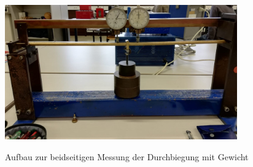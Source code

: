 \begin{figure}[h]
    \centering
    \includegraphics[width=10cm]{4.jpg}
    \label{fig:durchfuehrung4}
    \caption{Aufbau zur beidseitigen Messung der Durchbiegung mit Gewicht}
\end{figure}
